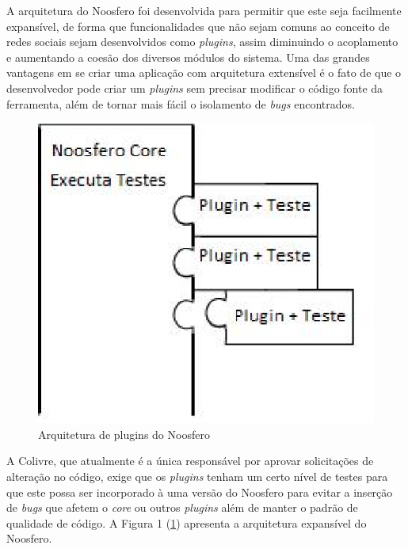 
A arquitetura do Noosfero foi desenvolvida para permitir que este seja facilmente
expansível, de forma que funcionalidades que não sejam comuns ao conceito de
redes sociais sejam desenvolvidos como \textit{plugins}, assim diminuindo
o acoplamento e aumentando a coesão dos diversos módulos do sistema.
%
Uma das grandes vantagens em se criar uma aplicação com arquitetura extensível
é o fato de que o desenvolvedor pode criar um \textit{plugins}
sem precisar modificar o código fonte da ferramenta, além de tornar mais
fácil o isolamento de \textit{bugs} encontrados. 

\begin{figure}[h]
	\centering
	\label{plugins}
		\includegraphics[keepaspectratio=true,scale=0.6]{figuras/plugins.eps}
	\caption{Arquitetura de plugins do Noosfero}
\end{figure}

A Colivre, que atualmente é a única responsável por aprovar solicitações de
alteração no código, exige que os \textit{plugins} tenham um certo nível de
testes para que este possa ser incorporado à uma versão do Noosfero para
evitar a inserção de \textit{bugs} que afetem o \textit{core} ou
outros \textit{plugins} além de manter o padrão de qualidade de código. A
Figura 1 (\ref{plugins}) apresenta a arquitetura expansível do Noosfero.

